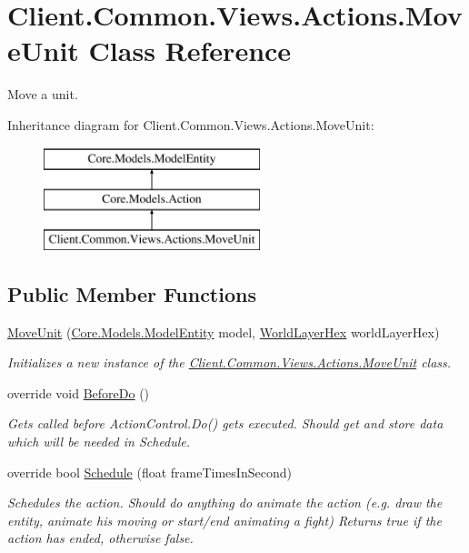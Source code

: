 \hypertarget{classClient_1_1Common_1_1Views_1_1Actions_1_1MoveUnit}{}\section{Client.\+Common.\+Views.\+Actions.\+Move\+Unit Class Reference}
\label{classClient_1_1Common_1_1Views_1_1Actions_1_1MoveUnit}


Move a unit.  


Inheritance diagram for Client.\+Common.\+Views.\+Actions.\+Move\+Unit\+:\begin{figure}[H]
\begin{center}
\leavevmode
\includegraphics[height=3.000000cm]{classClient_1_1Common_1_1Views_1_1Actions_1_1MoveUnit}
\end{center}
\end{figure}
\subsection*{Public Member Functions}
\begin{DoxyCompactItemize}
\item 
\hyperlink{classClient_1_1Common_1_1Views_1_1Actions_1_1MoveUnit_a0770a25b90af746710188f223e18cfb6}{Move\+Unit} (\hyperlink{classCore_1_1Models_1_1ModelEntity}{Core.\+Models.\+Model\+Entity} model, \hyperlink{classClient_1_1Common_1_1Views_1_1WorldLayerHex}{World\+Layer\+Hex} world\+Layer\+Hex)
\begin{DoxyCompactList}\small\item\em Initializes a new instance of the \hyperlink{classClient_1_1Common_1_1Views_1_1Actions_1_1MoveUnit}{Client.\+Common.\+Views.\+Actions.\+Move\+Unit} class. \end{DoxyCompactList}\item 
override void \hyperlink{classClient_1_1Common_1_1Views_1_1Actions_1_1MoveUnit_a781a55c5c7523ceeee2f64e275d35d09}{Before\+Do} ()
\begin{DoxyCompactList}\small\item\em Gets called before Action\+Control.\+Do() gets executed. Should get and store data which will be needed in Schedule. \end{DoxyCompactList}\item 
override bool \hyperlink{classClient_1_1Common_1_1Views_1_1Actions_1_1MoveUnit_a320dbf0d26ea3e24cfe87eedb61a2e22}{Schedule} (float frame\+Times\+In\+Second)
\begin{DoxyCompactList}\small\item\em Schedules the action. Should do anything do animate the action (e.\+g. draw the entity, animate his moving or start/end animating a fight) Returns true if the action has ended, otherwise false. \end{DoxyCompactList}\end{DoxyCompactItemize}

